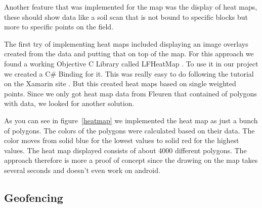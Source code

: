 Another feature that was implemented for the map was the display of heat maps, these should show data like a soil scan that is not bound to specific blocks but more to specific points on the field. 

The first try of implementing heat maps included displaying an image \glspl{overlay} created from the data and putting that on top of the map. For this approach we found a working Objective C Library called LFHeatMap \cite{LFHeatMaps}. To use it in our project we created a C\# Binding for it. 
This was really easy to do following the tutorial on the Xamarin site \cite{bindingtut}. But this created heat maps based on single weighted points. Since we only got heat map data from Fleuren that contained of polygons with data, we looked for another solution.

As you can see in figure~\ref{heatmap} we implemented the heat map as just a bunch of polygons. The colors of the polygons were calculated based on their data. The color moves from solid blue for the lowest values to solid red for the highest values. The heat map displayed consists of about 4000 different polygons. The approach therefore is more a proof of concept since the drawing on the map takes several seconds and doesn't even work on android.


\subsection{Geofencing}

